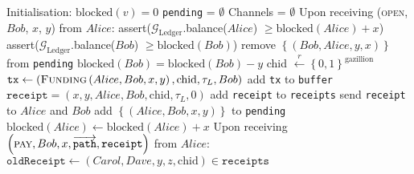 \begin{algorithm}
  \caption{$\mathcal{F}_{\mathrm{PayNet}}$}
  \label{alg:payfunc}
  \begin{algorithmic}[1]
    \State Initialisation:
      \Indent
        \State $\mathrm{blocked}\left(v\right) = 0$
      \EndFor
      \State \texttt{pending} = $\emptyset$
      \State Channels = $\emptyset$
      \EndIndent
    \State
    \State Upon receiving (\textsc{open}, $Bob$, $x$, $y$) from $Alice$:
    \Indent
        \State assert($\mathcal{G}_{\mathrm{Ledger}}$.balance($Alice$) $\geq
        \mathrm{blocked}\left(Alice\right) + x$)
        \State assert($\mathcal{G}_{\mathrm{Ledger}}$.balance($Bob$) $\geq
        \mathrm{blocked}\left(Bob\right)$)
        \State remove $\left\{\left(Bob, Alice, y, x\right)\right\}$ from
        \texttt{pending}
        \State $\mathrm{blocked}\left(Bob\right) = \mathrm{blocked}\left(Bob\right) - y$
        \State chid $\overset{r}{\leftarrow} \left\{0, 1\right\}^{\mathrm{gazillion}}$
        \State $\mathtt{tx} \gets \left(\textsc{Funding}\left(Alice, Bob, x, y\right),
        \mathrm{chid}, \tau_L, Bob\right)$
        \State add \texttt{tx} to \texttt{buffer}
        \State $\mathtt{receipt} = \left(x, y, Alice, Bob, \mathrm{chid},
        \tau_L, 0\right)$
        \State add \texttt{receipt} to \texttt{receipts}
        \State send \texttt{receipt} to $Alice$ and $Bob$
      \Else
        \State add $\left\{\left(Alice, Bob, x, y\right)\right\}$ to
        \texttt{pending}
        \State $\mathrm{blocked}\left(Alice\right) \leftarrow
        \mathrm{blocked}\left(Alice\right) + x$
      \EndIf
    \EndIndent
    \State
    \State Upon receiving $\left(\textsc{pay}, Bob, x, \overrightarrow{\mathtt{path}},
    \mathtt{receipt}\right)$ from $Alice$:
    \Indent
          \State $\mathtt{oldReceipt} \gets \left(Carol, Dave, y, z,
          \mathrm{chid}\right) \in \mathtt{receipts}$

\end{algorithmic}
\end{algorithm}
